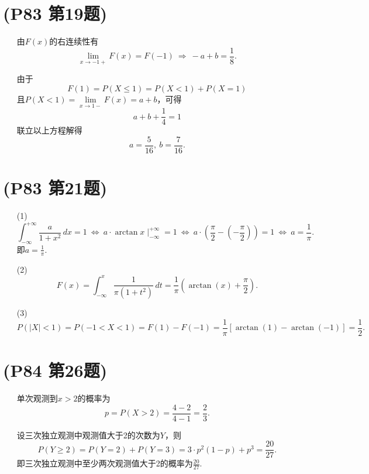 \documentclass{article}
\begin{document}
\section{(P83 第19题)}  %
\begin{enumerate}
    \item []由$F(x)$的右连续性有
    \[
        \lim\limits_{x\to -1+} F(x) = F(-1)
        \ \Rightarrow\ 
        -a+b=\frac{1}{8} .    
    \]
    \item []由于
    \[
        F(1) = P(X\leq 1) = P(X<1) + P(X=1)    
    \]
    且$P(X<1) =\lim\limits_{x\to 1-} F(x)=a+b$，可得
    \[
        a+b+\frac{1}{4}=1    
    \]
    联立以上方程解得
    \[
        a=\frac{5}{16},\ b=\frac{7}{16}.    
    \]
\end{enumerate}

\section{(P83 第21题)}  %
\begin{enumerate}
    \item [(1)]
    \[
        \int_{-\infty}^{+\infty} \frac{a}{1+x^2} \,dx =1 
        \ \Leftrightarrow\
        a\cdot \arctan x \mid _{-\infty}^{+\infty} =1
        \ \Leftrightarrow\
        a\cdot (\frac{\pi}{2} - (-\frac{\pi}{2})) =1
        \ \Leftrightarrow\ 
        a=\frac{1}{\pi}.
    \]
    即$a=\displaystyle{\frac{1}{\pi}}$.
    \item [(2)]
    \[
        F(x)= \int_{-\infty}^{x} \frac{1}{\pi(1+t^2)} \,dt =
        \frac{1}{\pi}(\arctan(x)+\frac{\pi}{2}).
    \]
    \item [(3)]
    \[
        P(|X|<1)=P(-1<X<1)
        =F(1)-F(-1)
        =\frac{1}{\pi}[\arctan(1)- \arctan(-1)]
        =\frac{1}{2}.  
    \]
\end{enumerate}

\section{(P84 第26题)}  %
\begin{enumerate}
    \item []单次观测到$x>2$的概率为
    \[
        p=P(X>2)=\displaystyle{\frac{4-2}{4-1}=\frac{2}{3}}.    
    \]
    \item []设三次独立观测中观测值大于2的次数为$Y$，则
    \[
        P(Y\geq 2)
        =P(Y=2)+P(Y=3)
        =3\cdot p^2 (1-p) + p^{3}
        =\frac{20}{27} .
    \]
    即三次独立观测中至少两次观测值大于2的概率为$\displaystyle{\frac{20}{27}}$.
\end{enumerate}
\end{document}
